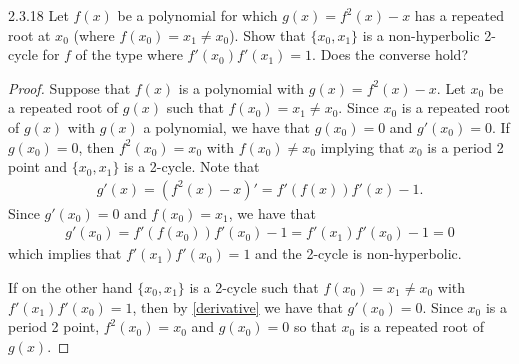\begin{problem}{2.3.18}
  Let $f(x)$ be a polynomial for which $g(x) = f^2(x) - x$ has a repeated root
  at $x_0$ (where $f(x_0) = x_1 \neq x_0$). Show that
  $\{x_0, x_1\}$ is a non-hyperbolic 2-cycle for $f$ of the type where $f'(x_0)f'(x_1) = 1$. Does
  the converse hold?
\end{problem}

\begin{proof}
  Suppose that $f(x)$ is a polynomial with $g(x) = f^2(x) - x$. Let $x_0$ be a repeated
  root of $g(x)$ such that $f(x_0) = x_1 \neq x_0$. Since $x_0$ is a repeated root of $g(x)$
  with $g(x)$ a polynomial, we have that $g(x_0) = 0$ and $g'(x_0) = 0$. If $g(x_0) = 0$,
  then $f^2(x_0) = x_0$ with $f(x_0) \neq x_0$ implying that $x_0$ is a period 2 point
  and $\{x_0, x_1\}$ is a 2-cycle. Note that
  \begin{align}\label{derivative}
    g'(x) = (f^2(x)-x)' = f'(f(x))f'(x) - 1.
  \end{align}
  Since $g'(x_0) = 0$ and $f(x_0) = x_1$, we have that
  \begin{align*}
    g'(x_0) = f'(f(x_0))f'(x_0) - 1 = f'(x_1)f'(x_0) - 1 = 0
  \end{align*}
  which implies that $f'(x_1)f'(x_0) = 1$ and the 2-cycle is non-hyperbolic.

  If on the other hand $\{x_0, x_1\}$ is a 2-cycle such that $f(x_0) = x_1 \neq x_0$
  with $f'(x_1)f'(x_0) = 1$, then by \eqref{derivative} we have that $g'(x_0) = 0$.
  Since $x_0$ is a period 2 point, $f^2(x_0) = x_0$ and $g(x_0) = 0$ so that $x_0$
  is a repeated root of $g(x)$.
\end{proof}
\newpage
